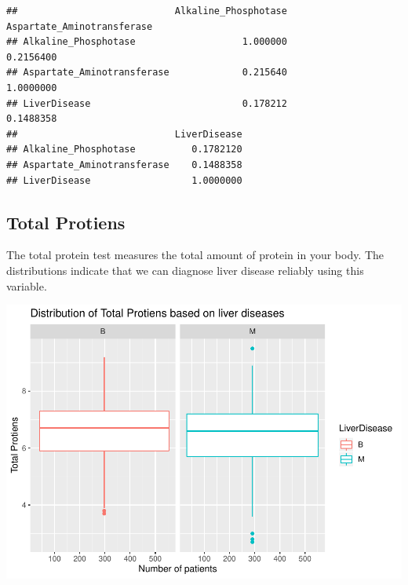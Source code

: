 \documentclass[]{article}
\newenvironment{Shaded}{\begin{snugshade}}{\end{snugshade}}
\newcommand{\CommentTok}[1]{\textcolor[rgb]{0.56,0.35,0.01}{\textit{#1}}}
\newcommand{\DataTypeTok}[1]{\textcolor[rgb]{0.13,0.29,0.53}{#1}}
\newcommand{\KeywordTok}[1]{\textcolor[rgb]{0.13,0.29,0.53}{\textbf{#1}}}
\newcommand{\NormalTok}[1]{#1}
\newcommand{\OperatorTok}[1]{\textcolor[rgb]{0.81,0.36,0.00}{\textbf{#1}}}
\newcommand{\StringTok}[1]{\textcolor[rgb]{0.31,0.60,0.02}{#1}}
\begin{document}
\begin{verbatim}
##                            Alkaline_Phosphotase Aspartate_Aminotransferase
## Alkaline_Phosphotase                   1.000000                  0.2156400
## Aspartate_Aminotransferase             0.215640                  1.0000000
## LiverDisease                           0.178212                  0.1488358
##                            LiverDisease
## Alkaline_Phosphotase          0.1782120
## Aspartate_Aminotransferase    0.1488358
## LiverDisease                  1.0000000
\end{verbatim}

\subsection{Total Protiens}

The total protein test measures the total amount of protein in your
body. The distributions indicate that we can diagnose liver disease
reliably using this variable.

\begin{Shaded}
\end{Shaded}

\includegraphics{LiverDisease_files/figure-latex/unnamed-chunk-19-1.pdf}
\end{document}
